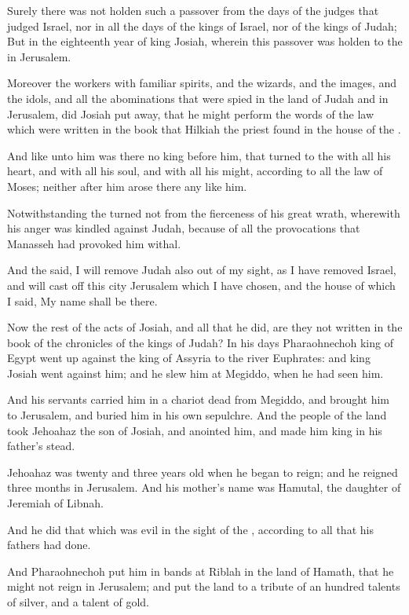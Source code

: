 \Verse Surely there was not holden such a passover from the days of the judges that judged Israel, nor in all the days of the kings of Israel, nor of the kings of Judah; \Verse But in the eighteenth year of king Josiah, wherein this passover was holden to the \LORD in Jerusalem.

\Verse Moreover the workers with familiar spirits, and the wizards, and the images, and the idols, and all the abominations that were spied in the land of Judah and in Jerusalem, did Josiah put away, that he might perform the words of the law which were written in the book that Hilkiah the priest found in the house of the \LORD.

\Verse And like unto him was there no king before him, that turned to the \LORD with all his heart, and with all his soul, and with all his might, according to all the law of Moses; neither after him arose there any like him.

\Verse Notwithstanding the \LORD turned not from the fierceness of his great wrath, wherewith his anger was kindled against Judah, because of all the provocations that Manasseh had provoked him withal.

\Verse And the \LORD said, I will remove Judah also out of my sight, as I have removed Israel, and will cast off this city Jerusalem which I have chosen, and the house of which I said, My name shall be there.

\Verse Now the rest of the acts of Josiah, and all that he did, are they not written in the book of the chronicles of the kings of Judah?  \Verse In his days Pharaohnechoh king of Egypt went up against the king of Assyria to the river Euphrates: and king Josiah went against him; and he slew him at Megiddo, when he had seen him.

\Verse And his servants carried him in a chariot dead from Megiddo, and brought him to Jerusalem, and buried him in his own sepulchre. And the people of the land took Jehoahaz the son of Josiah, and anointed him, and made him king in his father's stead.

\Verse Jehoahaz was twenty and three years old when he began to reign; and he reigned three months in Jerusalem. And his mother's name was Hamutal, the daughter of Jeremiah of Libnah.

\Verse And he did that which was evil in the sight of the \LORD, according to all that his fathers had done.

\Verse And Pharaohnechoh put him in bands at Riblah in the land of Hamath, that he might not reign in Jerusalem; and put the land to a tribute of an hundred talents of silver, and a talent of gold.

